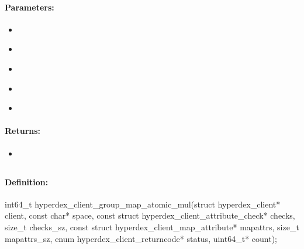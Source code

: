 \paragraph{Parameters:}
\begin{itemize}[noitemsep]
\item {}\\

\item {}\\

\item {}\\

\item {}\\

\item {}\\

\end{itemize}

\paragraph{Returns:}
\begin{itemize}[noitemsep]
\item {}\\

\end{itemize}

\pagebreak
\subsection{}
\label{api:c:group_map_atomic_mul}


\paragraph{Definition:}
\begin{ccode}
int64_t hyperdex_client_group_map_atomic_mul(struct hyperdex_client* client,
        const char* space,
        const struct hyperdex_client_attribute_check* checks, size_t checks_sz,
        const struct hyperdex_client_map_attribute* mapattrs, size_t mapattrs_sz,
        enum hyperdex_client_returncode* status,
        uint64_t* count);
\end{ccode}


